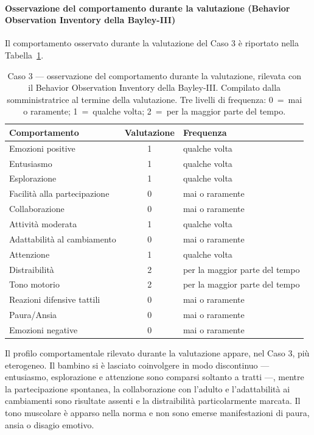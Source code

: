  \paragraph*{Osservazione del comportamento durante la valutazione (Behavior Observation Inventory della Bayley-III)}

Il comportamento osservato durante la valutazione del Caso 3 è riportato nella Tabella~\ref{tab:caso3_boi}.

\begin{table}[htbp]
\centering
\caption[Caso 3 --- osservazione del comportamento durante la valutazione]{Caso 3 --- osservazione del comportamento durante la valutazione, rilevata con il Behavior Observation Inventory della Bayley-III. Compilato dalla somministratrice al termine della valutazione. Tre livelli di frequenza: 0~=~mai o raramente; 1~=~qualche volta; 2~=~per la maggior parte del tempo.}
\label{tab:caso3_boi}
\begin{tabular}{|l|c|l|}
\toprule
\textbf{Comportamento} & \textbf{Valutazione} & \textbf{Frequenza} \\
\midrule
Emozioni positive & 1 & qualche volta \\
Entusiasmo & 1 & qualche volta \\
Esplorazione & 1 & qualche volta \\
Facilità alla partecipazione & 0 & mai o raramente \\
Collaborazione & 0 & mai o raramente \\
Attività moderata & 1 & qualche volta \\
Adattabilità al cambiamento & 0 & mai o raramente \\
Attenzione & 1 & qualche volta \\
Distraibilità & 2 & per la maggior parte del tempo \\
Tono motorio & 2 & per la maggior parte del tempo \\
Reazioni difensive tattili & 0 & mai o raramente \\
Paura/Ansia & 0 & mai o raramente \\
Emozioni negative & 0 & mai o raramente \\
\bottomrule
\end{tabular}
\end{table}

Il profilo comportamentale rilevato durante la valutazione appare, nel Caso 3, più eterogeneo. Il bambino si è lasciato coinvolgere in modo discontinuo --- entusiasmo, esplorazione e attenzione sono comparsi soltanto a tratti ---, mentre la partecipazione spontanea, la collaborazione con l'adulto e l'adattabilità ai cambiamenti sono risultate assenti e la distraibilità particolarmente marcata. Il tono muscolare è apparso nella norma e non sono emerse manifestazioni di paura, ansia o disagio emotivo.

